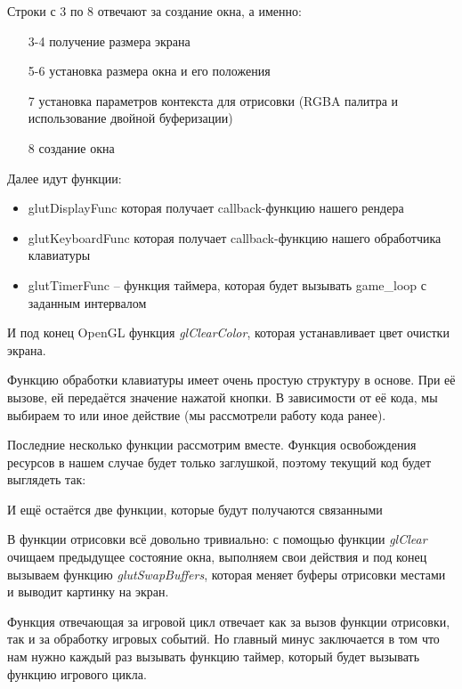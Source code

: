 Строки с 3 по 8 отвечают за создание окна, а именно:
\begin{itemize}
    \item[3-4] получение размера экрана
    \item[5-6] установка размера окна и его положения
    \item[7] установка параметров контекста для отрисовки 
        (RGBA палитра и использование двойной буферизации)
    \item[8] создание окна
\end{itemize}

Далее идут функции:
\begin{itemize} 
    \item glutDisplayFunc которая получает callback-функцию нашего рендера
    \item glutKeyboardFunc которая получает callback-функцию нашего обработчика клавиатуры
    \item glutTimerFunc -- функция таймера, которая будет вызывать game\_loop с заданным интервалом
\end{itemize}

И под конец OpenGL функция \emph{glClearColor}, которая устанавливает цвет очистки экрана.

Функцию обработки клавиатуры имеет очень простую структуру в основе. При её вызове, ей передаётся 
значение нажатой кнопки. В зависимости от её кода, мы выбираем то или иное действие (мы рассмотрели 
работу кода ранее).

Последние несколько функции рассмотрим вместе. Функция освобождения ресурсов в нашем случае будет только 
заглушкой, поэтому текущий код будет выглядеть так:



И ещё остаётся две функции, которые будут получаются связанными



В функции отрисовки всё довольно тривиально: с помощью функции \emph{glClear} очищаем предыдущее 
состояние окна, выполняем свои действия и под конец вызываем функцию \emph{glutSwapBuffers}, которая 
меняет буферы отрисовки местами и выводит картинку на экран.

Функция отвечающая за игровой цикл отвечает как за вызов функции отрисовки, так и за обработку игровых 
событий. Но главный минус заключается в том что нам нужно каждый раз вызывать функцию таймер, который 
будет вызывать функцию игрового цикла.


